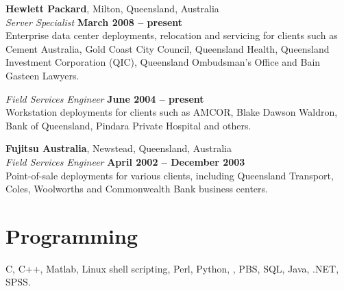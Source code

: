 \documentclass[margin,line]{resume}
\begin{document}
\begin{resume}
    \textbf{Hewlett Packard}, Milton, Queensland, Australia \vspace{2mm}\\\vspace{1mm}%
    \textsl{Server Specialist} \hfill \textbf{March 2008 -- present}\\
    Enterprise data center deployments, relocation and servicing
    for clients such as Cement Australia, Gold Coast City Council, Queensland Health,
    Queensland Investment Corporation (QIC), Queensland Ombudsman's Office and Bain Gasteen Lawyers.

    \textsl{Field Services Engineer} \hfill \textbf{June 2004 -- present}\vspace{1.5mm}\\\vspace{0mm}%
    Workstation deployments for clients such as AMCOR, 
    Blake Dawson Waldron, Bank of Queensland, Pindara Private Hospital and others. 

    \textbf{Fujitsu Australia}, Newstead, Queensland, Australia \vspace{2mm}\\\vspace{1mm}%
    \textsl{Field Services Engineer} \hfill \textbf{April 2002 -- December 2003}\\
    Point-of-sale deployments for various clients, 
    including Queensland Transport, Coles, Woolworths and Commonwealth Bank business centers. 



    \section{\mysidestyle Programming} 

    C, C++, Matlab, Linux shell scripting, Perl, Python, \LaTeXe, PBS, SQL, Java, .NET, SPSS.







\end{resume}
\end{document}
